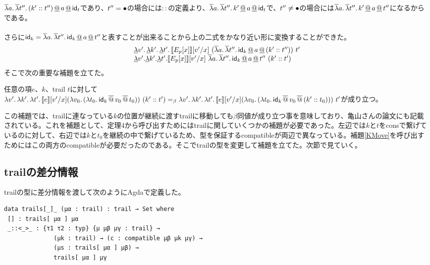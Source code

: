 $\overline{\lambda}{a}.\,{\overline{\lambda}{t''}.\,{(k'::t'')} \,\underline{@}\, a \,\underline{@}\, \textsf{id}_t}$であり、$t''=\bullet$の場合には$::$の定義より、$\overline{\lambda}{a}.\,{\overline{\lambda}{t''}.\,{k' \,\underline{@}\, a \,\underline{@}\, \textsf{id}_t}}$で、$t''\neq \bullet$の場合には$\overline{\lambda}{a}.\,{\overline{\lambda}{t''}.\,{k' \,\underline{@}\, a \,\underline{@}\, t''}}$になるからである。\\
\\
さらに$\textsf{id}_k = \overline{\lambda}{a}.\,{\overline{\lambda}{t''}.\,{\textsf{id}_k \,\underline{@}\, a \,\underline{@}\, t''}}$と表すことが出来ることから上の二式をかなり近い形に変換することができた。
\[
\begin{array}{l}
  \DLam{v'}{\DLam{k'}{\DLam{t'}{\CPSTh{E_p[x]}[\Change{x}{v'}]\
        \SLamP{a}{\SLam{t''}{\Idk \DAppS a \DAppS \ConsP{k'}{t''}}}\ t'}}}\\
  \DLamS v'.\DLamS k'.\DLamS t'.

     \CPSTh{E_p[x]}[\Change{x}{v'}]\
     \SLam{a}{\SLam{t''}{\Idk \DAppS a \DAppS t''}}\ \ConsP{k'}{t'}\\
     
\end{array}
\]
そこで次の重要な補題を立てた。

\begin{lemma}[$k$の移動]
  任意の項$e$、$k$、trail $t$に対して\\
  $\Lam{v'}{\Lam{k'}{\Lam{t'}{\CPSTh{e}[\Change{x}{v'}] \LamP{v_0}{\LamP{t_0}{\SApp{\Idk}{\SApp{v_0}{t_0}}}}\ \ConsP{k'}{t'}}}}
  =_{\beta} \\
  \Lam{v'}{\Lam{k'}{\Lam{t'}{\CPSTh{e}[\Change{x}{v'}] \LamP{v_0}{\LamP{t_0}{\SApp{\Idk}{\SApp{v_0}{\ConsP{k'}{t_0}}}}}\ t'}}}$が成り立つ。
\label{KMove}
\end{lemma}
この補題では、trailに連なっている$k$の位置が継続に渡すtrailに移動しても$\beta$同値が成り立つ事を意味しており、亀山さんの論文\cite{KY2008}にも記載されている。これを補題として、定理4から呼び出すためにはtrailに関していくつかの補題が必要であった。左辺では$k$と$t$を\textsf{cons}で繋げているのに対して、右辺では$k$と$t_0$を継続の中で繋げているため、型を保証する\textsf{compatible}が両辺で異なっている。補題\ref{KMove}を呼び出すためにはこの両方の\textsf{compatible}が必要だったのである。そこでtrailの型を変更して補題を立てた。次節で見ていく。

\subsection{trailの差分情報}
trailの型に差分情報を渡して次のようにAgdaで定義した。


\begin{verbatim}
data trails[_]_ (μα : trail) : trail → Set where
 [] : trails[ μα ] μα
 _::<_>_ : {τ1 τ2 : typ} {μ μβ μγ : trail} →
              (μk : trail) → (c : compatible μβ μk μγ) →
              (μs : trails[ μα ] μβ) →
              trails[ μα ] μγ
\end{verbatim}

